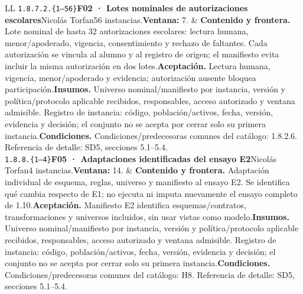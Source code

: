 \begin{longtable}{L{\tabcolsep\relax}L{\tabcolsep\relax}}
\texttt{1.\allowbreak{}8.\allowbreak{}7.\allowbreak{}2.\allowbreak{}\{1--56\}}\newline{}\textbf{F02 · Lotes nominales de autorizaciones escolares}\newline{}Nicolás Torfan\newline{}56 instancias.\newline{}\textbf{Ventana:} 7. & \textbf{Contenido y frontera.} Lote nominal de hasta 32 autorizaciones escolares: lectura humana, menor/apoderado, vigencia, consentimiento y rechazo de faltantes. Cada autorización se vincula al alumno y al registro de origen; el manifiesto evita incluir la misma autorización en dos lotes.\newline{}\textbf{Aceptación.} Lectura humana, vigencia, menor/apoderado y evidencia; autorización ausente bloquea participación.\newline{}\textbf{Insumos.} Universo nominal/manifiesto por instancia, versión y política/protocolo aplicable recibidos, responsables, acceso autorizado y ventana admisible. Registro de instancia: código, población/activos, fecha, versión, evidencia y decisión; el conjunto no se acepta por cerrar solo su primera instancia.\newline{}\textbf{Condiciones.} Condiciones/predecesoras comunes del catálogo: 1.8.2.6. Referencia de detalle: SD5, secciones 5.1--5.4.\\\hline
\texttt{1.\allowbreak{}8.\allowbreak{}8.\allowbreak{}\{1--4\}}\newline{}\textbf{F05 · Adaptaciones identificadas del ensayo E2}\newline{}Nicolás Torfan\newline{}4 instancias.\newline{}\textbf{Ventana:} 14. & \textbf{Contenido y frontera.} Adaptación individual de esquema, reglas, universo y manifiesto al ensayo E2. Se identifica qué cambia respecto de E1; no ejecuta ni imputa nuevamente el ensayo completo de 1.10.\newline{}\textbf{Aceptación.} Manifiesto E2 identifica esquemas/contratos, transformaciones y universos incluidos, sin usar vistas como modelo.\newline{}\textbf{Insumos.} Universo nominal/manifiesto por instancia, versión y política/protocolo aplicable recibidos, responsables, acceso autorizado y ventana admisible. Registro de instancia: código, población/activos, fecha, versión, evidencia y decisión; el conjunto no se acepta por cerrar solo su primera instancia.\newline{}\textbf{Condiciones.} Condiciones/predecesoras comunes del catálogo: H8. Referencia de detalle: SD5, secciones 5.1--5.4.\\\hline
\end{longtable}\endgroup
